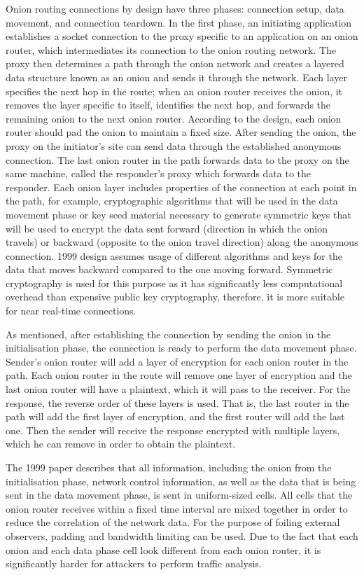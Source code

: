 Onion routing connections by design have three phases: connection setup, data movement, and connection teardown. In the first phase, an initiating application establishes a socket connection to the proxy specific to an application on an onion router, which intermediates its connection to the onion routing network. The proxy then determines a path through the onion network and creates a layered data structure known as an onion and sends it through the network. Each layer specifies the next hop in the route; when an onion router receives the onion, it removes the layer specific to itself, identifies the next hop, and forwards the remaining onion to the next onion router. According to the design, each onion router should pad the onion to maintain a fixed size. After sending the onion, the proxy on the initiator’s site can send data through the established anonymous connection. The last onion router in the path forwards data to the proxy on the same machine, called the responder’s proxy which forwards data to the responder.
Each onion layer includes properties of the connection at each point in the path, for example, cryptographic algorithms that will be used in the data movement phase or key seed material necessary to generate symmetric keys that will be used to encrypt the data sent forward (direction in which the onion travels) or backward (opposite to the onion travel direction) along the anonymous connection. 1999 design assumes usage of different algorithms and keys for the data that moves backward compared to the one moving forward. Symmetric cryptography is used for this purpose as it has significantly less computational overhead than expensive public key cryptography, therefore, it is more suitable for near real-time connections.

As mentioned, after establishing the connection by sending the onion in the initialisation phase, the connection is ready to perform the data movement phase. Sender’s onion router will add a layer of encryption for each onion router in the path. Each onion router in the route will remove one layer of encryption and the last onion router will have a plaintext, which it will pass to the receiver. For the response, the reverse order of these layers is used. That is, the last router in the path will add the first layer of encryption, and the first router will add the last one. Then the sender will receive the response encrypted with multiple layers, which he can remove in order to obtain the plaintext.

The 1999 paper describes that all information, including the onion from the initialisation phase, network control information, as well as the data that is being sent in the data movement phase, is sent in uniform-sized cells. All cells that the onion router receives within a fixed time interval are mixed together in order to reduce the correlation of the network data. For the purpose of foiling external observers, padding and bandwidth limiting can be used. Due to the fact that each onion and each data phase cell look different from each onion router, it is significantly harder for attackers to perform traffic analysis.

